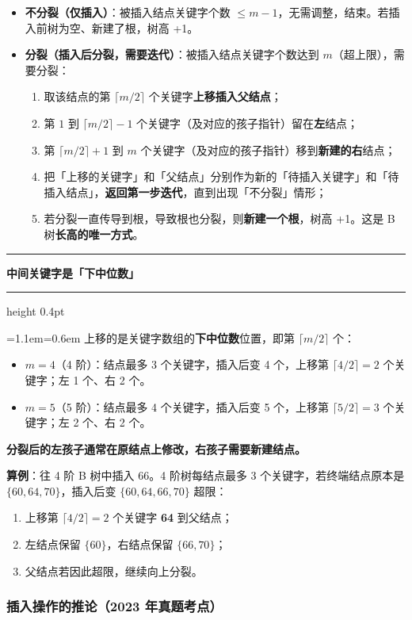 \documentclass[11pt,openany,UTF8]{ctexbook}
\newcommand{\callouthead}[2]{%
  \par\addvspace{7pt}\noindent
  {\color{#1}\rule[-0.15em]{3pt}{1.05em}}\hspace{0.5em}%
  {\bfseries\color{#1}#2}\par\nobreak\vspace{-0.35em}%
  {\color{rulesep}\hrule height 0.4pt}\nobreak\vspace{0.45em}%
  \begingroup\small\setlength{\parindent}{0pt}%
  \leftskip=1.1em\rightskip=0.6em\noindent\ignorespaces}
\newcommand{\calloutend}{\par\endgroup\addvspace{7pt}}
\newenvironment{callkey}[1]{\callouthead{keybar}{#1}}{\calloutend}
\begin{document}
\begin{itemize}
\item \textbf{不分裂（仅插入）}：被插入结点关键字个数 $\le m-1$，无需调整，结束。若插入前树为空、新建了根，树高 +1。
\item \textbf{分裂（插入后分裂，需要迭代）}：被插入结点关键字个数达到 $m$（超上限），需要分裂：
\begin{enumerate}
\item 取该结点的第 $\lceil m/2\rceil$ 个关键字\textbf{上移插入父结点}；
\item 第 $1$ 到 $\lceil m/2\rceil-1$ 个关键字（及对应的孩子指针）留在\textbf{左}结点；
\item 第 $\lceil m/2\rceil+1$ 到 $m$ 个关键字（及对应的孩子指针）移到\textbf{新建的右}结点；
\item 把「上移的关键字」和「父结点」分别作为新的「待插入关键字」和「待插入结点」，\textbf{返回第一步迭代}，直到出现「不分裂」情形；
\item 若分裂一直传导到根，导致根也分裂，则\textbf{新建一个根}，树高 +1。这是 B 树\textbf{长高的唯一方式}。
\end{enumerate}
\end{itemize}
\begin{callkey}{中间关键字是「下中位数」}
上移的是关键字数组的\textbf{下中位数}位置，即第 $\lceil m/2\rceil$ 个：

\begin{itemize}
\item $m=4$（4 阶）：结点最多 3 个关键字，插入后变 4 个，上移第 $\lceil 4/2\rceil=2$ 个关键字；左 1 个、右 2 个。
\item $m=5$（5 阶）：结点最多 4 个关键字，插入后变 5 个，上移第 $\lceil 5/2\rceil=3$ 个关键字；左 2 个、右 2 个。
\end{itemize}
\textbf{分裂后的左孩子通常在原结点上修改，右孩子需要新建结点。}

\end{callkey}

\textbf{算例}：往 4 阶 B 树中插入 66。4 阶树每结点最多 3 个关键字，若终端结点原本是 $\{60,64,70\}$，插入后变 $\{60,64,66,70\}$ 超限：

\begin{enumerate}
\item 上移第 $\lceil 4/2\rceil=2$ 个关键字 \textbf{64} 到父结点；
\item 左结点保留 $\{60\}$，右结点保留 $\{66,70\}$；
\item 父结点若因此超限，继续向上分裂。
\end{enumerate}
\subsubsection{插入操作的推论（2023 年真题考点）}
\end{document}
